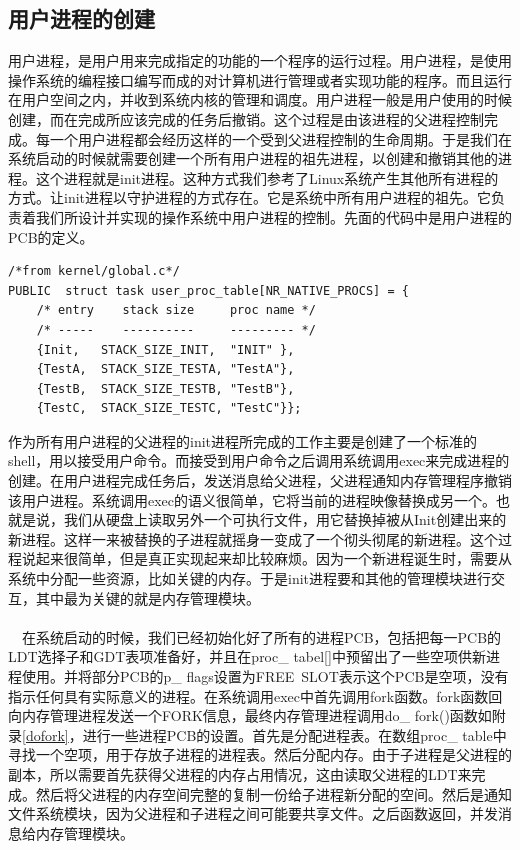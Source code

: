 \documentclass[UTF8,nofonts,cs4size]{ctexrep}
\begin{document}
\subsection{用户进程的创建}
用户进程，是用户用来完成指定的功能的一个程序的运行过程。用户进程，是使用操作系统的编程接口编写而成的对计算机进行管理或者实现功能的程序。而且运行在用户空间之内，并收到系统内核的管理和调度。用户进程一般是用户使用的时候创建，而在完成所应该完成的任务后撤销。这个过程是由该进程的父进程控制完成。每一个用户进程都会经历这样的一个受到父进程控制的生命周期。于是我们在系统启动的时候就需要创建一个所有用户进程的祖先进程，以创建和撤销其他的进程。这个进程就是init进程。这种方式我们参考了Linux系统产生其他所有进程的方式。让init进程以守护进程的方式存在。它是系统中所有用户进程的祖先。它负责着我们所设计并实现的操作系统中用户进程的控制。先面的代码中是用户进程的PCB的定义。
\begin{lstlisting}
/*from kernel/global.c*/
PUBLIC	struct task	user_proc_table[NR_NATIVE_PROCS] = {
	/* entry    stack size     proc name */
	/* -----    ----------     --------- */
	{Init,   STACK_SIZE_INIT,  "INIT" },
	{TestA,  STACK_SIZE_TESTA, "TestA"},
	{TestB,  STACK_SIZE_TESTB, "TestB"},
	{TestC,  STACK_SIZE_TESTC, "TestC"}};
\end{lstlisting}
作为所有用户进程的父进程的init进程所完成的工作主要是创建了一个标准的shell，用以接受用户命令。而接受到用户命令之后调用系统调用exec来完成进程的创建。在用户进程完成任务后，发送消息给父进程，父进程通知内存管理程序撤销该用户进程。系统调用exec的语义很简单，它将当前的进程映像替换成另一个。也就是说，我们从硬盘上读取另外一个可执行文件，用它替换掉被从Init创建出来的新进程。这样一来被替换的子进程就摇身一变成了一个彻头彻尾的新进程。这个过程说起来很简单，但是真正实现起来却比较麻烦。因为一个新进程诞生时，需要从系统中分配一些资源，比如关键的内存。于是init进程要和其他的管理模块进行交互，其中最为关键的就是内存管理模块。
\paragraph{}
\indent \ \ 在系统启动的时候，我们已经初始化好了所有的进程PCB，包括把每一PCB的LDT选择子和GDT表项准备好，并且在proc\_ tabel[]中预留出了一些空项供新进程使用。并将部分PCB的p\_ flags设置为FREE\ SLOT表示这个PCB是空项，没有指示任何具有实际意义的进程。在系统调用exec中首先调用fork函数。fork函数回向内存管理进程发送一个FORK信息，最终内存管理进程调用do\_ fork()函数如附录\ref{dofork}，进行一些进程PCB的设置。首先是分配进程表。在数组proc\_ table中寻找一个空项，用于存放子进程的进程表。然后分配内存。由于子进程是父进程的副本，所以需要首先获得父进程的内存占用情况，这由读取父进程的LDT来完成。然后将父进程的内存空间完整的复制一份给子进程新分配的空间。然后是通知文件系统模块，因为父进程和子进程之间可能要共享文件。之后函数返回，并发消息给内存管理模块。
\end{document}
